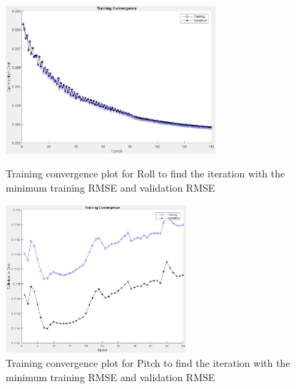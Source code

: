 \begin{figure}[H]
    \centering
    \begin{minipage}[b]{0.45\textwidth}
        \centering
        \includegraphics[height=5.5cm,keepaspectratio]{img/roll_tuning.png}
        \caption{Training convergence plot for Roll to find the iteration with the minimum training RMSE and validation RMSE}
        \label{fig:roll_tuning}
    \end{minipage}
    \hfill
    \begin{minipage}[b]{0.45\textwidth}
        \centering
        \includegraphics[height=5.5cm,keepaspectratio]{img/pitch_tuning.png}
        \caption{Training convergence plot for Pitch to find the iteration with the minimum training RMSE and validation RMSE}
        \label{fig:pitch_tuning}
    \end{minipage}
\end{figure}
